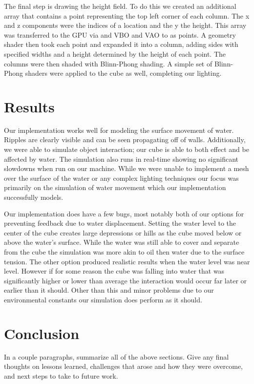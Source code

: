 \documentclass[12pt,titlepage]{article}
\begin{document}
The final step is drawing the height field.  To do this we created an additional array that contains a point representing the top left corner of each column.  The x and z components were the indices of a location and the y the height.  This array was transferred to the GPU via and VBO and VAO to as points.  A geometry shader then took each point and expanded it into a column, adding sides with specified widths and a height determined by the height of each point.  The columns were then shaded with Blinn-Phong shading.  A simple set of Blinn-Phong shaders were applied to the cube as well, completing our lighting.

\section{Results}

Our implementation works well for modeling the surface movement of water.  Ripples are clearly visible and can be seen propagating off of walls. Additionally, we were able to simulate object interaction; our cube is able to both effect and be affected by water.  The simulation also runs in real-time showing no significant slowdowns when run on our machine. While we were unable to implement a mesh over the surface of the water or any complex lighting techniques our focus was primarily on the simulation of water movement which our implementation successfully models.

Our implementation does have a few bugs, most notably both of our options for preventing feedback due to water displacement.  Setting the water level to the center of the cube creates large depressions or hills as the cube moved below or above the water’s surface.  While the water was still able to cover and separate from the cube the simulation was more akin to oil then water due to the surface tension.  The other option produced realistic results when the water level was near level.  However if for some reason the cube was falling into water that was significantly higher or lower than average the interaction would occur far later or earlier than it should.  Other than this and minor problems due to our environmental constants our simulation does perform as it should.

\section{Conclusion}

In a couple paragraphs, summarize all of the above sections. Give any final thoughts on lessons learned, challenges that arose and how they were overcome, and next steps to take to future work.

\nocite{*}
\printbibliography
\end{document}

